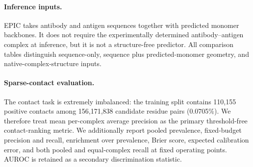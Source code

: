 
\begin{abstract}
Predicting antibody--antigen interfaces from sequence inputs is difficult because residue--residue contacts are extremely sparse, partner-specific, and coupled to residue-level paratope and epitope labels. We present EPIC, a multi-task framework that combines frozen protein-language-model representations with intra-chain geometry from predicted monomer structures. EPIC uses geometry-aware self-attention, bidirectional cross-chain communication, and a shared low-rank residue-pair representation to predict contacts, paratopes, and epitopes. We evaluate EPIC on the official SAbDab2 split. Because contact positives constitute only 0.0705\% of training candidate pairs, we emphasize average precision and practical ranking budgets rather than AUROC alone. EPIC provides a unified prediction profile across the three interface resolutions without requiring an experimentally determined antibody--antigen complex at inference. The results support EPIC as a sequence-input, predicted-geometry framework, while controlled analyses show that the contributions of geometry, task coupling, and pairwise decoding are heterogeneous and should not be interpreted as universal improvements.
\end{abstract}

\paragraph{Inference inputs.}
EPIC takes antibody and antigen sequences together with predicted monomer backbones. It does not require the experimentally determined antibody--antigen complex at inference, but it is not a structure-free predictor. All comparison tables distinguish sequence-only, sequence plus predicted-monomer geometry, and native-complex-structure inputs.

\paragraph{Sparse-contact evaluation.}
The contact task is extremely imbalanced: the training split contains 110,155 positive contacts among 156,171,838 candidate residue pairs (0.0705\%). We therefore treat mean per-complex average precision as the primary threshold-free contact-ranking metric. We additionally report pooled prevalence, fixed-budget precision and recall, enrichment over prevalence, Brier score, expected calibration error, and both pooled and equal-complex recall at fixed operating points. AUROC is retained as a secondary discrimination statistic.

